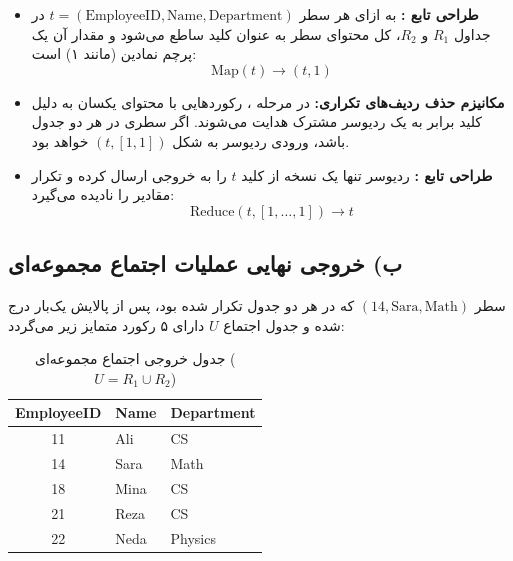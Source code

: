 \documentclass[11pt,a4paper]{article}
\begin{document}
	\begin{itemize}
		\item \textbf{طراحی تابع :}
		به ازای هر سطر $t = (\text{EmployeeID}, \text{Name}, \text{Department})$ در جداول $R_1$ و $R_2$، کل محتوای سطر به عنوان کلید ساطع می‌شود و مقدار آن یک پرچم نمادین (مانند ۱) است:
		\begin{equation}
			\text{Map}(t) \longrightarrow (t, 1)
		\end{equation}
		\item \textbf{مکانیزم حذف ردیف‌های تکراری:}
		در مرحله ، رکوردهایی با محتوای یکسان به دلیل کلید برابر به یک ردیوسر مشترک هدایت می‌شوند. اگر سطری در هر دو جدول باشد، ورودی ردیوسر به شکل $(t, [1, 1])$ خواهد بود.
		\item \textbf{طراحی تابع :}
		ردیوسر تنها یک نسخه از کلید $t$ را به خروجی ارسال کرده و تکرار مقادیر را نادیده می‌گیرد:
		\begin{equation}
			\text{Reduce}(t, [1, \dots, 1]) \longrightarrow t
		\end{equation}
	\end{itemize}
	
	\subsection{ب) خروجی نهایی عملیات اجتماع مجموعه‌ای}
	سطر $(14, \text{Sara}, \text{Math})$ که در هر دو جدول تکرار شده بود، پس از پالایش یک‌بار درج شده و جدول اجتماع $U$ دارای ۵ رکورد متمایز زیر می‌گردد:
	
	\begin{table}[H]
		\centering
		\small
		\renewcommand{\arraystretch}{1.35}
		\caption{جدول خروجی اجتماع مجموعه‌ای ($U = R_1 \cup R_2$)}
		\vspace{0.15cm}
		\begin{latin}
			\begin{tabular}{cll}
				\toprule
				\rowcolor{headerBg}
				\textbf{EmployeeID} & \textbf{Name} & \textbf{Department} \\
				\midrule
				11 & Ali & CS \\
				14 & Sara & Math \\
				18 & Mina & CS \\
				21 & Reza & CS \\
				22 & Neda & Physics \\
				\bottomrule
			\end{tabular}
		\end{latin}
	\end{table}
	
\end{document}
